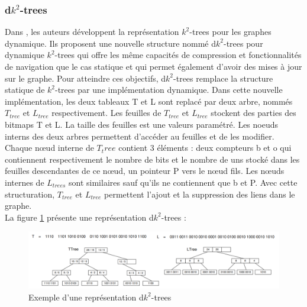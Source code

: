 \subsubsection{d$k^2$-trees}
Dans \citep{brisaboa2012compressed}, les auteurs développent la représentation $k^2$-trees pour les graphes dynamique. Ils proposent une nouvelle structure nommé d$k^2$-trees pour dynamique $k^2$-trees qui offre les même capacités de compression et fonctionnalités de navigation que le cas statique et qui permet également d'avoir des mises à jour sur le graphe. Pour atteindre ces objectifs, d$k^2$-trees remplace la structure statique de $k^2$-trees par une implémentation dynamique. Dans cette nouvelle implémentation, les deux tableaux T et L sont replacé par deux arbre, nommés $T_{tree}$ et $L_{tree}$ respectivement. Les feuilles de $T_{tree}$ et $L_{tree}$ stockent des parties des bitmaps T et L. La taille des feuilles est une valeurs paramétré. Les noeuds interns des deux arbres permettent d'accéder au feuilles et  de les modifier.\\
Chaque nœud interne de $T_tree$ contient 3 éléments : deux compteurs b et o qui contiennent respectivement le nombre de bits et le nombre de uns stocké dans les feuilles descendantes de ce nœud, un pointeur P vers le nœud fils. Les nœuds internes de $L_{trees}$ sont similaires sauf qu'ils ne contiennent que b et P. Avec cette structuration, $T_{tree}$ et $L_{tree}$ permettent l'ajout et la suppression des liens dans le graphe.\\
La figure \ref{dk2-trees} présente une représentation d$k^2$-trees : 

\begin{figure}[H]
\begin{center}
\includegraphics[height=100 pt, width=380 pt]{./ressources/image/dk2-trees.png} 
\end{center}
\caption{Exemple d'une représentation d$k^2$-trees}
\label{dk2-trees}
\end{figure}

